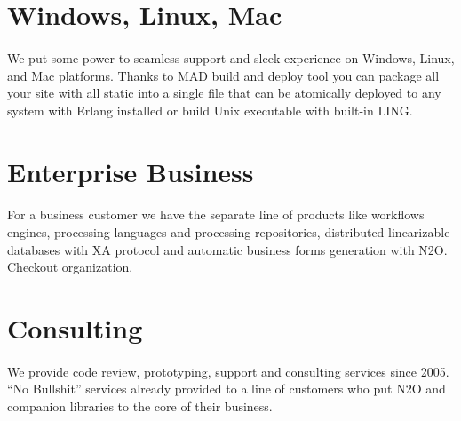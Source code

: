 \documentclass[11pt]{article}
\begin{document}
\paragraph{}

\section*{Windows, Linux, Mac}
\paragraph{}
We put some power to seamless support and sleek experience on Windows, Linux, and Mac platforms.
Thanks to MAD build and deploy tool you can package all your site with all static into a single
file that can be atomically deployed to any system with Erlang installed or build Unix
executable with built-in LING.

\section*{Enterprise Business}
\paragraph{}
For a business customer we have the separate line of products like workflows engines,
processing languages and processing repositories, distributed linearizable databases
with XA protocol and automatic business forms generation with N2O.
Checkout  organization.

\section*{Consulting}
\paragraph{}
We provide code review, prototyping, support and consulting services since 2005.
``No Bullshit'' services already provided to a line of customers who put N2O and
companion libraries to the core of their business.
\end{document}
